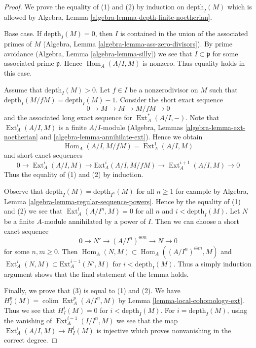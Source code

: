 \documentclass{stacks-project}
\theoremstyle{plain}
\theoremstyle{definition}
\theoremstyle{remark}
\numberwithin{equation}{subsection}
\def\colim{\mathop{\mathrm{colim}}\nolimits}
\def\Hom{\mathop{\mathrm{Hom}}\nolimits}
\def\Ext{\mathop{\mathrm{Ext}}\nolimits}
\begin{document}
\begin{proof}
We prove the equality of (1) and (2) by induction on $\text{depth}_I(M)$
which is allowed by
Algebra, Lemma \ref{algebra-lemma-depth-finite-noetherian}.

\medskip\noindent
Base case. If $\text{depth}_I(M) = 0$, then $I$ is contained in the union
of the associated primes of $M$
(Algebra, Lemma \ref{algebra-lemma-ass-zero-divisors}).
By prime avoidance (Algebra, Lemma \ref{algebra-lemma-silly})
we see that $I \subset \mathfrak p$ for some associated prime $\mathfrak p$.
Hence $\Hom_A(A/I, M)$
is nonzero. Thus equality holds in this case.

\medskip\noindent
Assume that $\text{depth}_I(M) > 0$. Let $f \in I$ be a nonzerodivisor
on $M$ such that $\text{depth}_I(M/fM) = \text{depth}_I(M) - 1$.
Consider the short exact sequence
$$
0 \to M \to M \to M/fM \to 0
$$
and the associated long exact sequence for $\Ext^*_A(A/I, -)$.
Note that $\Ext^i_A(A/I, M)$ is a finite $A/I$-module
(Algebra, Lemmas \ref{algebra-lemma-ext-noetherian} and
\ref{algebra-lemma-annihilate-ext}). Hence we obtain
$$
\Hom_A(A/I, M/fM) = \Ext^1_A(A/I, M)
$$
and short exact sequences
$$
0 \to \Ext^i_A(A/I, M) \to \text{Ext}^i_A(A/I, M/fM) \to
\Ext^{i + 1}_A(A/I, M) \to 0
$$
Thus the equality of (1) and (2) by induction.

\medskip\noindent
Observe that $\text{depth}_I(M) = \text{depth}_{I^n}(M)$ for all $n \geq 1$
for example by Algebra, Lemma \ref{algebra-lemma-regular-sequence-powers}.
Hence by the equality of (1) and (2) we see that
$\Ext^i_A(A/I^n, M) = 0$ for all $n$ and $i < \text{depth}_I(M)$.
Let $N$ be a finite $A$-module annihilated by a power of $I$.
Then we can choose a short exact sequence
$$
0 \to N' \to (A/I^n)^{\oplus m} \to N \to 0
$$
for some $n, m \geq 0$. Then
$\Hom_A(N, M) \subset \Hom_A((A/I^n)^{\oplus m}, M)$
and
$\Ext^i_A(N, M) \subset \text{Ext}^{i - 1}_A(N', M)$
for $i < \text{depth}_I(M)$. Thus a simply induction argument
shows that the final statement of the lemma holds.

\medskip\noindent
Finally, we prove that (3) is equal to (1) and (2).
We have $H^p_I(M) = \colim \Ext^p_A(A/I^n, M)$ by
Lemma \ref{lemma-local-cohomology-ext}.
Thus we see that $H^i_I(M) = 0$ for $i < \text{depth}_I(M)$.
For $i = \text{depth}_I(M)$, using the vanishing of
$\Ext_A^{i - 1}(I/I^n, M)$ we see that the map
$\Ext_A^i(A/I, M) \to H_I^i(M)$ is injective which
proves nonvanishing in the correct degree.
\end{proof}
\end{document}
